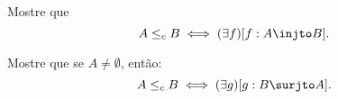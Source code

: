 \begin{exercise}
    Mostre que
    $$
    A \leq_c B \iff (\exists f)[f : A \injto B].
    $$
\end{exercise}

\begin{exercise}
    Mostre que se $A \not = \emptyset$, então:
    $$
    A \leq_c B \iff (\exists g)[g : B \surjto A].
    $$
\end{exercise}
